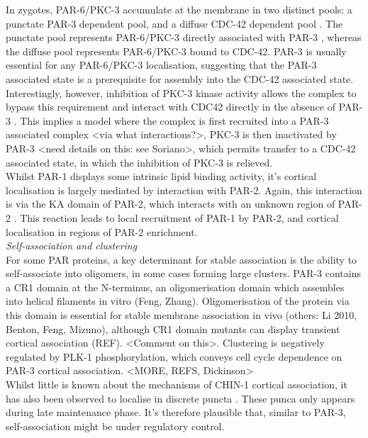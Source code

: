 \documentclass[12pt]{"report"}
\begin{document}
In zygotes, PAR-6/PKC-3 accumulate at the membrane in two distinct pools: a punctate PAR-3 dependent pool, and a diffuse CDC-42 dependent pool \citep{Aceto2006, Beers2006}. The punctate pool represents PAR-6/PKC-3 directly associated with PAR-3 \citep{Dickinson2017}, whereas the diffuse pool represents PAR-6/PKC-3 bound to CDC-42. PAR-3 is usually essential for any PAR-6/PKC-3 localisation, suggesting that the PAR-3 associated state is a prerequisite for assembly into the CDC-42 associated state. Interestingly, however, inhibition of PKC-3 kinase activity allows the complex to bypass this requirement and interact with CDC42 directly in the absence of PAR-3 \citep{Rodriguez2017}. This implies a model where the complex is first recruited into a PAR-3 associated complex <via what interactions?>, PKC-3 is then inactivated by PAR-3 <need details on this: see Soriano>, which permits transfer to a CDC-42 associated state, in which the inhibition of PKC-3 is relieved.\\

Whilst PAR-1 displays some intrinsic lipid binding activity, it’s cortical localisation is largely mediated by interaction with PAR-2. Again, this interaction is via the KA domain of PAR-2, which interacts with an unknown region of PAR-2 \citep{Motegi2011}. This reaction leads to local recruitment of PAR-1 by PAR-2, and cortical localisation in regions of PAR-2 enrichment.\\


\textit{Self-association and clustering}\\

For some PAR proteins, a key determinant for stable association is the ability to self-associate into oligomers, in some cases forming large clusters. PAR-3 contains a CR1 domain at the N-terminus, an oligomerisation domain which assembles into helical filaments in vitro (Feng, Zhang). Oligomerisation of the protein via this domain is essential for stable membrane association in vivo \citep{Dickinson2017} (others: Li 2010, Benton, Feng, Mizuno), although CR1 domain mutants can display transient cortical association (REF). <Comment on this>. Clustering is negatively regulated by PLK-1 phosphorylation, which conveys cell cycle dependence on PAR-3 cortical association. <MORE, REFS, Dickinson>\\

Whilst little is known about the mechanisms of CHIN-1 cortical association, it has also been observed to localise in discrete puncta \citep{Kumfer2010}. These punca only appears during late maintenance phase. It's therefore plausible that, similar to PAR-3, self-association might be under regulatory control.\\
\end{document}
